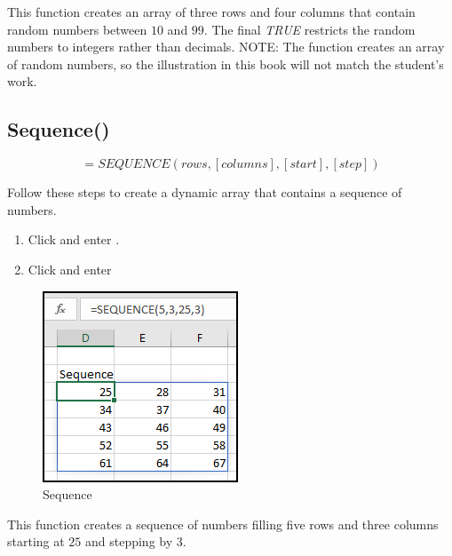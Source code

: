 This function creates an array of three rows and four columns that contain random numbers between $ 10 $ and $ 99 $. The final \textit{TRUE} restricts the random numbers to integers rather than decimals. NOTE: The function creates an array of random numbers, so the illustration in this book will not match the student's work.

\subsection{Sequence()}

\[ =SEQUENCE(rows,[columns],[start],[step]) \]

Follow these steps to create a dynamic array that contains a sequence of numbers.

\begin{enumbox}
	\begin{enumerate}
		\item Click  and enter .
		\item Click  and enter 
	\end{enumerate}
\end{enumbox}

\begin{figure}[H]
	\centering
	\includegraphics[width=\maxwidth{.45\linewidth}]{gfx/apb_fig09}
	\caption{Sequence}
	\label{apb:fig09}
\end{figure}

This function creates a sequence of numbers filling five rows and three columns starting at $ 25 $ and stepping by $ 3 $. 

